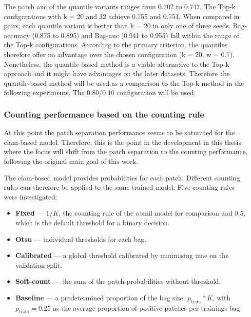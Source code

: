 \documentclass[12pt,parskip = half, DIV=classic,listof=totoc]{scrartcl}
\begin{document}
			The patch \ac{auc} of the quantile variants ranges from 0.702 to
			0.747. The Top-k configurations with k = 20 and 32 achieve 0.755 and 0.753.
			When compared in pairs, each quantile variant is better than k = 20 in only one of three seeds.
			Bag-accuracy (0.875 to 0.895) and Bag-\acs*{auc} (0.941 to 0.955) fall within the range of the
			Top-k configurations. According to the primary criterion, the quantiles therefore offer no
			advantage over the chosen configuration (k = 20, w = 0.7). Nonetheless, 
			the quantile-based method is a viable alternative to the Top-k approach and it might have advantages on the later datasets.
			Therefore the quantile-based method will be used as a comparison to the Top-k method in the following experiments.
			The $0.80/0.10$ configuration will be used.


			\subsubsection{Counting performance based on the counting rule}\label{sec:clam_thresholding}
			At this point the patch separation performance seems to be saturated for the \acs*{clam}-based model. Therefore, this is the point 
			in the development in this thesis where the focus will shift from the patch separation to the counting performance, following 
			the original main goal of this work.

			The \acs*{clam}-based model provides probabilities for each patch. Different counting rules can therefore
			be applied to the same trained model. Five counting rules were investigated:
			\begin{itemize}
				\item \textbf{Fixed} --- $1/K$, the counting rule of the \ac{abmil} model for comparison and 0.5, which is the default threshold for a binary decision.
				\item \textbf{Otsu} --- individual thresholds for each bag.
				\item \textbf{Calibrated} --- a global threshold calibrated by minimising \ac{mae} on the validation split.
				\item \textbf{Soft-count} --- the sum of the patch-probabilities without threshold.
				\item \textbf{Baseline} --- a predetermined proportion of the bag size: $p_\text{train} * K$, with $p_\text{train} = 0.25$
					as the average proportion of positive patches per trainings bag.
			\end{itemize}
\end{document}
